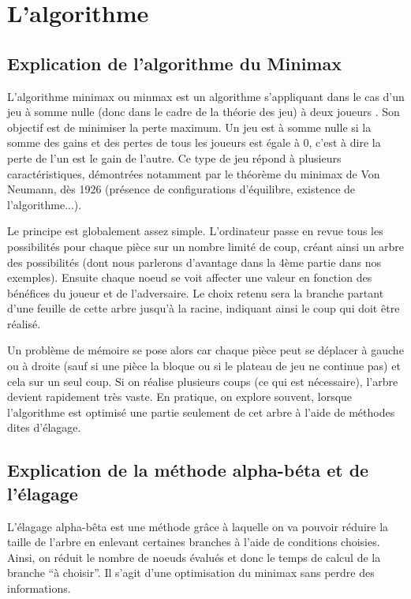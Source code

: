 \documentclass[12,french]{report}
\begin{document}
\chapter{L'algorithme}

\section{Explication de l'algorithme du Minimax }

L'algorithme minimax ou minmax est un algorithme s'appliquant dans le cas d'un jeu à somme nulle (donc dans le cadre de la théorie des jeu) à deux joueurs . Son objectif est de minimiser la perte maximum. Un jeu est à somme nulle si la somme des gains et des pertes de tous les joueurs est égale à 0, c'est à dire la perte de l'un est le gain de l'autre. Ce type de jeu répond à plusieurs caractéristiques, démontrées notamment par le théorème du minimax de Von Neumann, dès 1926 (présence de configurations d'équilibre, existence de l'algorithme...).

Le principe est globalement assez simple. L'ordinateur passe en revue
tous les possibilités pour chaque pièce sur un nombre limité de coup,
créant ainsi un arbre des possibilités (dont nous parlerons d'avantage
dans la 4ème partie dans nos exemples). Ensuite chaque noeud se voit
affecter une valeur en fonction des bénéfices du joueur et de l'adversaire.
Le choix retenu sera la branche partant d'une feuille de cette arbre
jusqu'à la racine, indiquant ainsi le coup qui doit être réalisé. 

Un problème de mémoire se pose alors car chaque pièce peut se déplacer
à gauche ou à droite (sauf si une pièce la bloque ou si le plateau
de jeu ne continue pas) et cela sur un seul coup. Si on réalise plusieurs
coups (ce qui est nécessaire), l'arbre devient rapidement très vaste.
En pratique, on explore souvent, lorsque l'algorithme est optimisé
une partie seulement de cet arbre à l'aide de méthodes dites d'élagage.

\section{Explication de la méthode alpha-béta et de l'élagage}

L'élagage alpha-bêta est une méthode grâce à laquelle on va pouvoir réduire la taille de l'arbre en enlevant certaines branches à l'aide de conditions choisies. Ainsi, on réduit le nombre de noeuds évalués et donc le temps de calcul de la branche ``à choisir''. Il s'agit d'une optimisation du minimax sans perdre des informations. 
\end{document}
